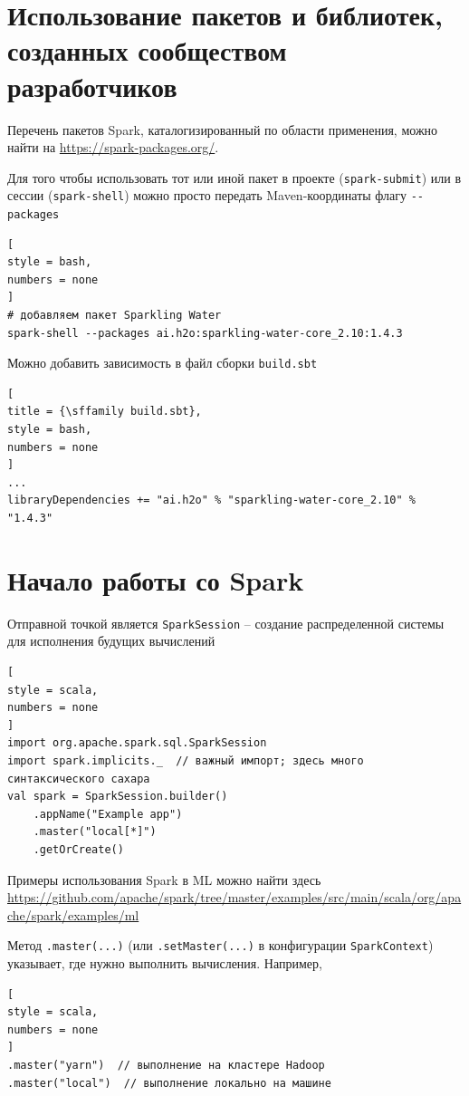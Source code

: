 \documentclass[%
	11pt,
	a4paper,
	utf8,
		]{article}
\begin{document}
\section{Использование пакетов и библиотек, созданных сообществом разработчиков}

Перечень пакетов Spark, каталогизированный по области применения, можно найти на \url{https://spark-packages.org/}.

Для того чтобы использовать тот или иной пакет в проекте (\verb|spark-submit|) или в сессии (\verb|spark-shell|) можно просто передать  Maven-координаты флагу \verb|--packages|
\begin{lstlisting}[
style = bash,
numbers = none	
]
# добавляем пакет Sparkling Water
spark-shell --packages ai.h2o:sparkling-water-core_2.10:1.4.3
\end{lstlisting}

Можно добавить зависимость в файл сборки \texttt{build.sbt}
\begin{lstlisting}[
title = {\sffamily build.sbt},
style = bash,
numbers = none	
]
...
libraryDependencies += "ai.h2o" % "sparkling-water-core_2.10" % "1.4.3"
\end{lstlisting}



\section{Начало работы со Spark}

Отправной точкой является \texttt{SparkSession} -- создание распределенной системы для исполнения будущих вычислений
\begin{lstlisting}[
style = scala,
numbers = none	
]
import org.apache.spark.sql.SparkSession
import spark.implicits._  // важный импорт; здесь много синтаксического сахара
val spark = SparkSession.builder()
    .appName("Example app")
    .master("local[*]")
    .getOrCreate()
\end{lstlisting}

Примеры использования Spark в ML можно найти здесь \url{https://github.com/apache/spark/tree/master/examples/src/main/scala/org/apache/spark/examples/ml}

Метод \texttt{.master(...)} (или \texttt{.setMaster(...)} в конфигурации \texttt{SparkContext}) указывает, где нужно выполнить вычисления. Например,
\begin{lstlisting}[
style = scala,
numbers = none
]
.master("yarn")  // выполнение на кластере Hadoop
.master("local")  // выполнение локально на машине
\end{lstlisting}
\end{document}
